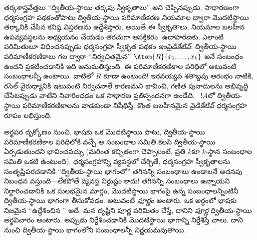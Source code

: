 \documentclass[../../../include/open-logic-section]{subfiles}
\begin{document}
తర్కశాస్త్రవేత్తలు ``ద్వితీయ-స్థాయి తర్కపు స్వీకృతాలు'' అని
చెప్పినప్పుడు, సాధారణంగా ధర్మసంగ్రహ పథకంతోపాటు ద్వితీయ-స్థాయి
పరిమాణీకరణ నియమాల ద్వారా మొదటిస్థాయి తర్కానికి చేసిన కనిష్ఠ విస్తరణను
ఉద్దేశిస్తారు. అయితే ఈ స్వీకృతాలు, నియమాల బలహీన ఉపవ్యవస్థలను
అధ్యయనం చేయడం తరచుగా ఆసక్తికరం. ఉదాహరణకు, ఎలాంటి పరిమితులూ విధించనప్పుడు
ధర్మసంగ్రహ స్వీకృత పథకం \emph{ఇంప్రెడికేటివ్}: ద్వితీయ-స్థాయి
పరిమాణీకరణికాలు గల  ద్వారా ``నిర్వచితమైన''
$\Atom{R}{x_1, \dots, x_k}$ అనే సంబంధం ఉందని ప్రకటించడానికి ఇది
అనుమతిస్తుంది. ఈ పరిమాణీకరణికాల పరిధిలో అటువంటి సంబంధాలన్నీ ఉంటాయి.
వాటిలో $R$ కూడా ఉంటుంది!{} ఇరవయ్యవ శతాబ్దపు
ఆరంభం నాటికి, రసెల్ వైరుధ్యానికి ఇటువంటి నిర్వచనాలే కారణమని భావించి,
గణిత పునాదులను అభివృద్ధి చేసేటప్పుడు వాటిని నివారించడం ఒక సాధారణ
ప్రతిస్పందనగా ఉండేది. ~$!A$లో ద్వితీయ-స్థాయి పరిమాణీకరణికాలను
వాడకుండా నిషేధిస్తే, కొంత బలహీనమైన {\em ప్రెడికేటివ్} ధర్మసంగ్రహ
రూపం లభిస్తుంది.

అర్థపర దృక్కోణం నుంచి, భాషకు ఒక మొదటిస్థాయి పాటు,
ద్వితీయ-స్థాయి పరిమాణీకరణికాల పరిధిలోకి వచ్చే ఆ  సంబంధాల సమితి
కలసి ద్వితీయ-స్థాయి  ఏర్పడుతుందని భావించవచ్చు (మరింత
కచ్చితంగా చెప్పాలంటే, ప్రతి $k$కూ $k$-స్థాన సంబంధాల సమితి ఒకటి ఉంటుంది).
ధర్మసంగ్రహాన్ని  వ్యవస్థలో చేర్చితే, ధర్మసంగ్రహ
స్వీకృతాలను సంతృప్తిపరచడానికి ``ద్వితీయ-స్థాయి భాగంలో'' తగినన్ని
సంబంధాలు ఉండాలనే అదనపు నిబంధన వస్తుంది---లేకపోతే 
వ్యవస్థ నిర్దుష్టం కాదు!{} తగినన్ని సంబంధాలు ఉన్నాయని నిర్ధారించడానికి
ఒక సులభమైన మార్గం, మొదటిస్థాయి భాగంపై ఉన్న సంబంధాలన్నింటినీ
ద్వితీయ-స్థాయి భాగంగా తీసుకోవడం. అటువంటి 
\emph{పూర్ణం} అంటారు. ఒక అర్థంలో భాషకు నిజమైన ``ఉద్దేశించిన
'' అదే. మన దృష్టిని పూర్ణ  పరిమితం
చేస్తే, దానిని \emph{పూర్ణ} ద్వితీయ-స్థాయి అర్థవిచారం అంటారు. అప్పుడు
 నిర్దేశించడానికి మొదటిస్థాయి భాగాన్ని నిర్దేశిస్తే చాలు.
దాని నుంచి ద్వితీయ-స్థాయి భాగంలోని సంబంధాలన్నీ నిర్ణయమవుతాయి.
\end{document}
